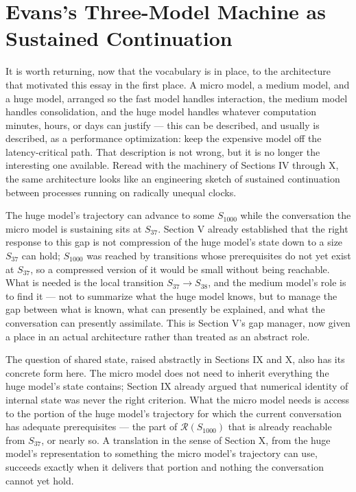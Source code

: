 \documentclass[11pt]{article}
\begin{document}
\section{Evans's Three-Model Machine as Sustained Continuation}

It is worth returning, now that the vocabulary is in place, to the architecture that motivated this essay in the first place. A micro model, a medium model, and a huge model, arranged so the fast model handles interaction, the medium model handles consolidation, and the huge model handles whatever computation minutes, hours, or days can justify --- this can be described, and usually is described, as a performance optimization: keep the expensive model off the latency-critical path. That description is not wrong, but it is no longer the interesting one available. Reread with the machinery of Sections IV through X, the same architecture looks like an engineering sketch of sustained continuation between processes running on radically unequal clocks.

The huge model's trajectory can advance to some $S_{1000}$ while the conversation the micro model is sustaining sits at $S_{37}$. Section V already established that the right response to this gap is not compression of the huge model's state down to a size $S_{37}$ can hold; $S_{1000}$ was reached by transitions whose prerequisites do not yet exist at $S_{37}$, so a compressed version of it would be small without being reachable. What is needed is the local transition $S_{37} \to S_{38}$, and the medium model's role is to find it --- not to summarize what the huge model knows, but to manage the gap between what is known, what can presently be explained, and what the conversation can presently assimilate. This is Section V's gap manager, now given a place in an actual architecture rather than treated as an abstract role.

The question of shared state, raised abstractly in Sections IX and X, also has its concrete form here. The micro model does not need to inherit everything the huge model's state contains; Section IX already argued that numerical identity of internal state was never the right criterion. What the micro model needs is access to the portion of the huge model's trajectory for which the current conversation has adequate prerequisites --- the part of $\mathcal{R}(S_{1000})$ that is already reachable from $S_{37}$, or nearly so. A translation in the sense of Section X, from the huge model's representation to something the micro model's trajectory can use, succeeds exactly when it delivers that portion and nothing the conversation cannot yet hold.
\end{document}
